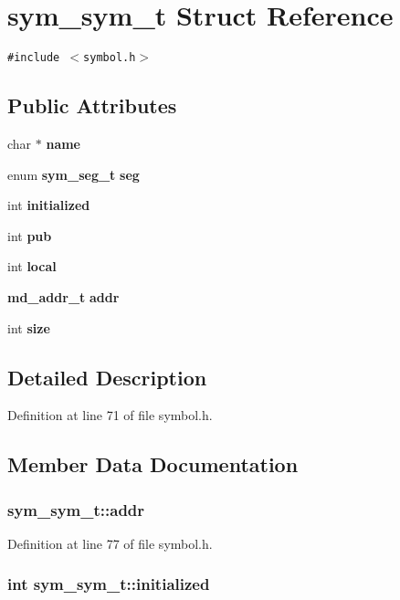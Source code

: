 \section{sym\_\-sym\_\-t Struct Reference}
\label{structsym__sym__t}
{\tt \#include $<$symbol.h$>$}

\subsection*{Public Attributes}
\begin{CompactItemize}
\item 
char $\ast$ {\bf name}
\item 
enum {\bf sym\_\-seg\_\-t} {\bf seg}
\item 
int {\bf initialized}
\item 
int {\bf pub}
\item 
int {\bf local}
\item 
{\bf md\_\-addr\_\-t} {\bf addr}
\item 
int {\bf size}
\end{CompactItemize}


\subsection{Detailed Description}


Definition at line 71 of file symbol.h.

\subsection{Member Data Documentation}
\subsubsection[{addr}]{ {\bf sym\_\-sym\_\-t::addr}}\label{structsym__sym__t_2fc35b52de2d0500699ff901e233149c}




Definition at line 77 of file symbol.h.
\subsubsection[{initialized}]{\setlength{\rightskip}{0pt plus 5cm}int {\bf sym\_\-sym\_\-t::initialized}}\label{structsym__sym__t_2cca44c5b32acce1550d1fb10af9d6be}




